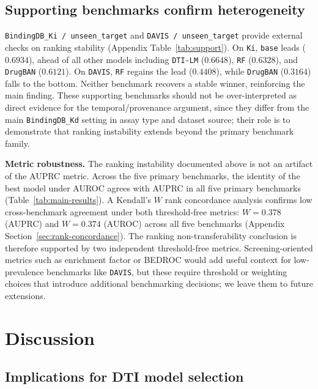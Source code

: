 \documentclass[referee,pdflatex,sn-basic,Numbered]{sn-jnl}
\newcommand{\AUPRC}{AUPRC}
\newcommand{\AUROC}{AUROC}
\begin{document}
\subsection{Supporting benchmarks confirm heterogeneity}

\texttt{BindingDB\_Ki / unseen\_target} and \texttt{DAVIS / unseen\_target} provide external checks on ranking stability (Appendix Table~\ref{tab:support}). On \texttt{Ki}, \texttt{base} leads ($0.6934$), ahead of all other models including \texttt{DTI-LM} ($0.6648$), \texttt{RF} ($0.6328$), and \texttt{DrugBAN} ($0.6121$). On \texttt{DAVIS}, \texttt{RF} regains the lead ($0.4408$), while \texttt{DrugBAN} ($0.3164$) falls to the bottom. Neither benchmark recovers a stable winner, reinforcing the main finding. These supporting benchmarks should not be over-interpreted as direct evidence for the temporal/provenance argument, since they differ from the main \texttt{BindingDB\_Kd} setting in assay type and dataset source; their role is to demonstrate that ranking instability extends beyond the primary benchmark family.

\textbf{Metric robustness.} The ranking instability documented above is not an artifact of the \AUPRC{} metric. Across the five primary benchmarks, the identity of the best model under \AUROC{} agrees with \AUPRC{} in all five primary benchmarks (Table~\ref{tab:main-results}). A Kendall's $W$ rank concordance analysis confirms low cross-benchmark agreement under both threshold-free metrics: $W = 0.378$ (\AUPRC{}) and $W = 0.374$ (\AUROC{}) across all five benchmarks (Appendix Section~\ref{sec:rank-concordance}). The ranking non-transferability conclusion is therefore supported by two independent threshold-free metrics. Screening-oriented metrics such as enrichment factor or BEDROC would add useful context for low-prevalence benchmarks like \texttt{DAVIS}, but these require threshold or weighting choices that introduce additional benchmarking decisions; we leave them to future extensions.

\section{Discussion}
\label{sec:discussion}

\subsection{Implications for DTI model selection}
\end{document}
